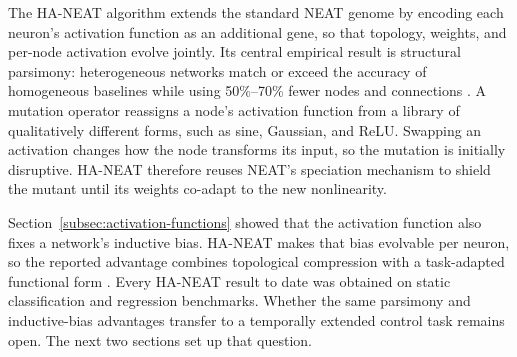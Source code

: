 \documentclass[12pt]{article}
\begin{document}




The HA-NEAT algorithm \parencite{hagg_evolving_2017} extends the standard NEAT genome by encoding each neuron's activation function as an additional gene, so that topology, weights, and per-node activation evolve jointly.
Its central empirical result is structural parsimony: heterogeneous networks match or exceed the accuracy of homogeneous baselines while using 50\%--70\% fewer nodes and connections \parencite{hagg_evolving_2017}.
A mutation operator reassigns a node's activation function from a library of qualitatively different forms, such as sine, Gaussian, and ReLU.
Swapping an activation changes how the node transforms its input, so the mutation is initially disruptive.
HA-NEAT therefore reuses NEAT's speciation mechanism to shield the mutant until its weights co-adapt to the new nonlinearity.

Section~\ref{subsec:activation-functions} showed that the activation function also fixes a network's inductive bias.
HA-NEAT makes that bias evolvable per neuron, so the reported advantage combines topological compression with a task-adapted functional form \parencite{papavasileiou_optimizing_2022}.
Every HA-NEAT result to date was obtained on static classification and regression benchmarks.
Whether the same parsimony and inductive-bias advantages transfer to a temporally extended control task remains open. The next two sections set up that question.
\end{document}
